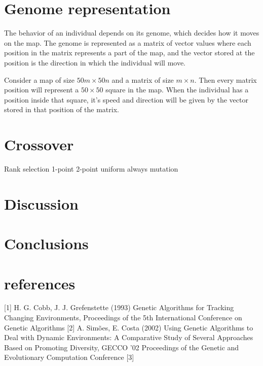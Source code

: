 \documentclass[a4paper,12pt]{article}
\begin{document}
\section{Genome representation}
The behavior of an individual depends on its genome, which decides how it moves on the map. The genome is represented as a matrix of vector values where each position in the matrix represents a part of the map, and the vector stored at the position is the direction in which the individual will move.

Consider a map of size $50m \times 50n$ and a matrix of size $m \times n$. Then every matrix position will represent a $50\times50$ square in the map. When the individual has a position inside that square, it's speed and direction will be given by the vector stored in that position of the matrix.

\section{Crossover}
Rank selection
1-point
2-point
uniform
always mutation



\section{Discussion}

\section{Conclusions}

\section{references}
[1] H. G. Cobb, J. J. Grefenstette (1993) Genetic Algorithms for Tracking Changing Environments, Proceedings of the 5th International Conference on Genetic Algorithms
[2] A. Simões, E. Costa (2002) Using Genetic Algorithms to Deal with Dynamic Environments: A Comparative Study of Several Approaches Based on Promoting Diversity, GECCO '02 Proceedings of the Genetic and Evolutionary Computation Conference
[3]
\end{document}
